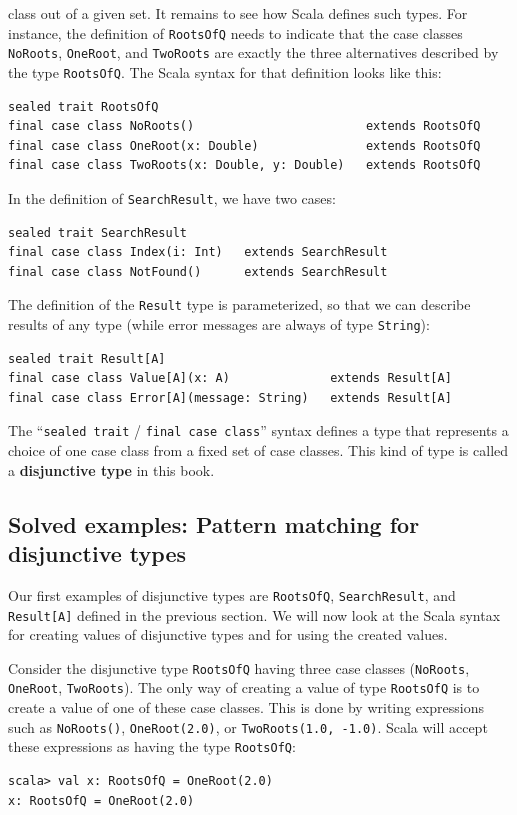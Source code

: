 class out of a given set. It remains to see how Scala defines such
types. For instance, the definition of \lstinline!RootsOfQ! needs
to indicate that the case classes \lstinline!NoRoots!, \lstinline!OneRoot!,
and \lstinline!TwoRoots! are exactly the three alternatives described
by the type \lstinline!RootsOfQ!. The Scala syntax for that definition
looks like this:
\begin{lstlisting}
sealed trait RootsOfQ
final case class NoRoots()                        extends RootsOfQ
final case class OneRoot(x: Double)               extends RootsOfQ
final case class TwoRoots(x: Double, y: Double)   extends RootsOfQ
\end{lstlisting}
In the definition of \lstinline!SearchResult!, we have two cases:
\begin{lstlisting}
sealed trait SearchResult
final case class Index(i: Int)   extends SearchResult
final case class NotFound()      extends SearchResult
\end{lstlisting}
The definition of the \lstinline!Result! type is parameterized, so
that we can describe results of any type (while error messages are
always of type \lstinline!String!):
\begin{lstlisting}
sealed trait Result[A]
final case class Value[A](x: A)              extends Result[A]
final case class Error[A](message: String)   extends Result[A]
\end{lstlisting}

The \textsf{``}\lstinline!sealed trait! / \lstinline!final case class!\textsf{''}
syntax defines a type that represents a choice of one case class from
a fixed set of case classes. This kind of type is called a \textbf{disjunctive
type} in this book. 

\subsection{Solved examples: Pattern matching for disjunctive types}

Our first examples of disjunctive types are \lstinline!RootsOfQ!,
\lstinline!SearchResult!, and \lstinline!Result[A]! defined in the
previous section. We will now look at the Scala syntax for creating
values of disjunctive types and for using the created values.

Consider the disjunctive type \lstinline!RootsOfQ! having three case
classes (\lstinline!NoRoots!, \lstinline!OneRoot!, \lstinline!TwoRoots!).
The only way of creating a value of type \lstinline!RootsOfQ! is
to create a value of one of these case classes. This is done by writing
expressions such as \lstinline!NoRoots()!, \lstinline!OneRoot(2.0)!,
or \lstinline!TwoRoots(1.0, -1.0)!. Scala will accept these expressions
as having the type \lstinline!RootsOfQ!:
\begin{lstlisting}
scala> val x: RootsOfQ = OneRoot(2.0)
x: RootsOfQ = OneRoot(2.0)
\end{lstlisting}

